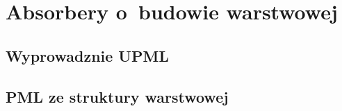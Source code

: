 \chapter{Absorbery o~budowie warstwowej}
\label{roz:pml}

\section{Wyprowadznie UPML}

\section{PML ze struktury warstwowej~\cite{ania2015}}

